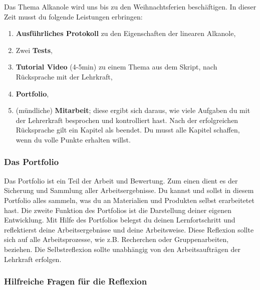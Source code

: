 \documentclass{scrartcl}  %
\begin{document}
					Das Thema Alkanole wird uns bis zu den Weihnachtsferien beschäftigen. In dieser Zeit musst du folgende Leistungen erbringen:
					\begin{enumerate}
						\item \textbf{Ausführliches Protokoll} zu den Eigenschaften der linearen Alkanole,
						\item Zwei \textbf{Tests},
						\item \textbf{Tutorial Video} (4-5min) zu einem Thema aus dem Skript, nach Rücksprache mit der Lehrkraft,
						\item \textbf{Portfolio},
						\item (mündliche) \textbf{Mitarbeit}; diese ergibt sich daraus, wie viele Aufgaben du mit der Lehrerkraft besprochen und kontrolliert hast. Nach der erfolgreichen Rücksprache gilt ein Kapitel als beendet. Du musst alle Kapitel schaffen, wenn du volle Punkte erhalten willst.  
					\end{enumerate}
	
					\subsubsection{Das Portfolio}
					
						Das Portfolio ist ein Teil der Arbeit und Bewertung. Zum einen dient es der Sicherung und Sammlung aller Arbeitsergebnisse. Du kannst und sollst in diesem Portfolio alles sammeln, was du an Materialien und Produkten selbst erarbeitetet hast. 
						Die zweite Funktion des Portfolios ist die Darstellung deiner eigenen Entwicklung. Mit Hilfe des Portfolios belegst du deinen Lernfortschritt und reflektierst deine Arbeitsergebnisse und deine Arbeitsweise. Diese Reflexion sollte sich  auf alle Arbeitsprozesse, wie z.B. Recherchen oder Gruppenarbeiten, beziehen. Die Selbstreflexion sollte unabhängig von den Arbeitsaufträgen der Lehrkraft erfolgen.
			
					\subsubsection{Hilfreiche Fragen für die Reflexion}
			
						\begin{center}
						\end{center}
			
\end{document}
